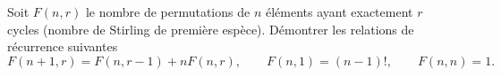 Soit $F(n, r)$ le nombre de permutations de $n$ éléments ayant exactement $r$ cycles (nombre de Stirling de première espèce). Démontrer les relations de récurrence suivantes
\[ F(n + 1, r) = F(n, r - 1) + nF(n, r),\qquad F(n, 1) = (n - 1)!,\qquad F(n, n) = 1. \]

